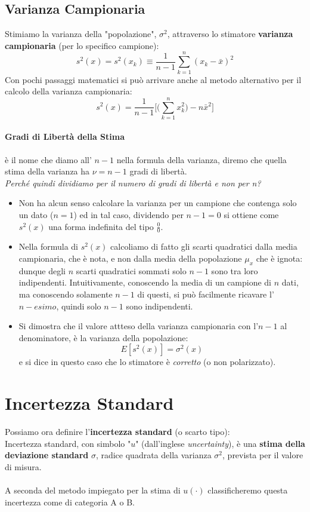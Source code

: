 \documentclass[a4paper,11pt]{report}
\begin{document}
\subsection{Varianza Campionaria}
Stimiamo la varianza della "popolazione", $\sigma^2$, attraverso lo stimatore \textbf{varianza campionaria} (per lo specifico campione):
$$
  s^2(x) = s^2(x_k) \equiv \frac{1}{n-1}\sum^{n}_{k=1}(x_k-\bar{x})^2
$$
Con pochi passaggi matematici si può arrivare anche al metodo alternativo per il calcolo della varianza campionaria:
$$
  s^2(x) = \frac{1}{n-1}\Bigg[\Bigg(\sum^{n}_{k=1}x^2_k\Bigg)-n\bar{x}^2\Bigg]
$$
\paragraph{Gradi di Libertà della Stima} è il nome che diamo all' $n-1$ nella formula della varianza, diremo che quella stima della varianza ha $\nu = n-1$ gradi di libertà.\\

\textit{Perché quindi dividiamo per il numero di gradi di libertà e non per n?}
\begin{itemize}
  \item Non ha alcun senso calcolare la varianza per un campione che contenga solo un dato ($n=1$) ed in tal caso, dividendo per $n-1 = 0$ si ottiene come $s^2(x)$ una forma indefinita del tipo $\frac{0}{0}$.
  \item Nella formula di $s^2(x)$ calcoliamo di fatto gli scarti quadratici dalla media campionaria, che è nota, e non dalla media della popolazione $\mu_x$ che è ignota: dunque degli $n$ scarti quadratici sommati solo $n-1$ sono tra loro indipendenti. Intuitivamente, conoscendo la media di un campione di $n$ dati, ma conoscendo solamente $n-1$ di questi, si può facilmente ricavare l'$n-esimo$, quindi solo $n-1$ sono indipendenti.
  \item Si dimostra che il valore attteso della varianza campionaria con l'$n-1$ al denominatore, è la varianza della popolazione:
  $$
    E[s^2(x)] = \sigma^2(x)
  $$
  e si dice in questo caso che lo stimatore è \textit{corretto} (o non polarizzato).
\end{itemize}
\section{Incertezza Standard}
Possiamo ora definire l'\textbf{incertezza standard} (o scarto tipo):\\

Incertezza standard, con simbolo "$u$" (dall'inglese \textit{uncertainty}), è una \textbf{stima della deviazione standard} $\sigma$, radice quadrata della varianza $\sigma^2$, prevista per il valore di misura.\\ \\
A seconda del metodo impiegato per la stima di $u(\cdotp)$ classificheremo questa incertezza come di categoria A o B.
\end{document}
